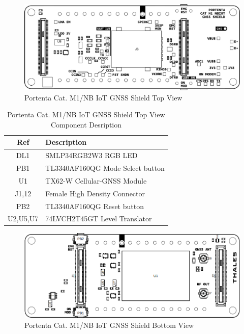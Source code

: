 \begin{figure}[H]
	\begin{center}
		\includegraphics[width=0.7\linewidth]{Images/PotentaIoTGNSSShield/TopView.png}
		\caption{Portenta Cat. M1/NB IoT GNSS Shield Top View}
		\label{TopView}
	\end{center}
\end{figure}

\begin{table}[ht]
	\centering
	\begin{tabular}{|c|l|}
		\hline
		\textbf{Ref} & \textbf{Description}\\
		\hline
		DL1 & SMLP34RGB2W3 RGB LED \\
		\hline
		PB1 & TL3340AF160QG Mode Select button \\
		\hline
		U1  & TX62-W Cellular-GNSS Module \\
		\hline
		J1,12 & Female High Density Connector \\
		\hline
		PB2 & TL3340AF160QG Reset button \\
		\hline
		U2,U5,U7  & 74LVCH2T45GT Level Translator \\		
		\hline
	\end{tabular}
	\caption{Portenta Cat. M1/NB IoT GNSS Shield Top View Component Desription}
	\label{tab:TableTopView}
\end{table}

\begin{figure}[H]
	\begin{center}
		\includegraphics[width=0.7\linewidth]{Images/PotentaIoTGNSSShield/BottomView.png}
		\caption{Portenta Cat. M1/NB IoT GNSS Shield Bottom View}
		\label{BottomView}
	\end{center}
\end{figure}

